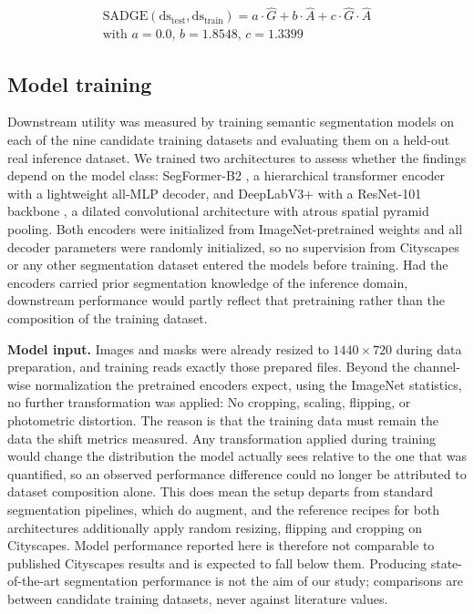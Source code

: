 \documentclass[conference]{IEEEtran}
\begin{document}
\begin{equation}
\label{eq:sadge}
\begin{split}
\text{SADGE}(\text{ds}_\text{test}, \text{ds}_\text{train}) = a \cdot \hat{G} + b \cdot \hat{A} + c \cdot \hat{G} \cdot \hat{A}
\\
\text{with } a=0.0\text{, } b=1.8548\text{, } c=1.3399
\end{split}
\end{equation}

\subsection{Model training}
Downstream utility was measured by training semantic segmentation models on each of the nine candidate training datasets and evaluating them on a held-out real inference dataset. We trained two architectures to assess whether the findings depend on the model class: SegFormer-B2 \cite{xie2021segformer}, a hierarchical transformer encoder with a lightweight all-MLP decoder, and DeepLabV3+ \cite{chen2018deeplabv3plus} with a ResNet-101 backbone \cite{he2016resnet}, a dilated convolutional architecture with atrous spatial pyramid pooling. Both encoders were initialized from ImageNet-pretrained weights and all decoder parameters were randomly initialized, so no supervision from Cityscapes or any other segmentation dataset entered the models before training. Had the encoders carried prior segmentation knowledge of the inference domain, downstream performance would partly reflect that pretraining rather than the composition of the training dataset.

\textbf{Model input.} Images and masks were already resized to $1440 \times 720$ during data preparation, and training reads exactly those prepared files. Beyond the channel-wise normalization the pretrained encoders expect, using the ImageNet statistics, no further transformation was applied: No cropping, scaling, flipping, or photometric distortion. The reason is that the training data must remain the data the shift metrics measured. Any transformation applied during training would change the distribution the model actually sees relative to the one that was quantified, so an observed performance difference could no longer be attributed to dataset composition alone. This does mean the setup departs from standard segmentation pipelines, which do augment, and the reference recipes for both architectures additionally apply random resizing, flipping and cropping on Cityscapes. Model performance reported here is therefore not comparable to published Cityscapes results and is expected to fall below them. Producing state-of-the-art segmentation performance is not the aim of our study; comparisons are between candidate training datasets, never against literature values.
\end{document}
